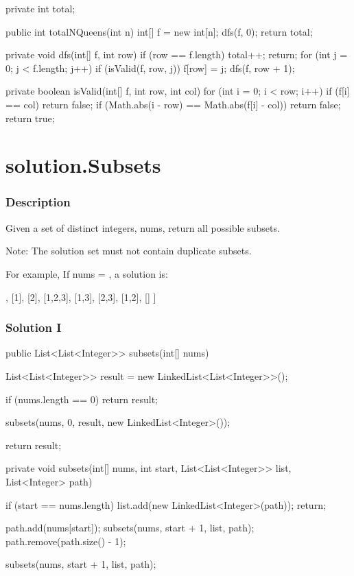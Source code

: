 \begin{Code}
private int total;

public int totalNQueens(int n) {
    int[] f = new int[n];
    dfs(f, 0);
    return total;
}

private void dfs(int[] f, int row) {
    if (row == f.length) {
        total++;
        return;
    }
    for (int j = 0; j < f.length; j++) {
        if (isValid(f, row, j)) {
            f[row] = j;
            dfs(f, row + 1);
        }
    }
}

private boolean isValid(int[] f, int row, int col) {
    for (int i = 0; i < row; i++) {
        if (f[i] == col) {
            return false;
        }
        if (Math.abs(i - row) == Math.abs(f[i] - col)) {
            return false;
        }
    }
    return true;
}
\end{Code}

\newpage

\section{solution.Subsets} %

\subsubsection{Description}

Given a set of distinct integers, nums, return all possible subsets.

Note: The solution set must not contain duplicate subsets.

For example,
If nums = \code{[1,2,3]}, a solution is:

\begin{Code}
[
  [3],
  [1],
  [2],
  [1,2,3],
  [1,3],
  [2,3],
  [1,2],
  []
]
\end{Code}

\subsubsection{Solution I}

\begin{Code}
public List<List<Integer>> subsets(int[] nums) {
    List<List<Integer>> result = new LinkedList<List<Integer>>();

    if (nums.length == 0) {
        return result;
    }

    subsets(nums, 0, result, new LinkedList<Integer>());

    return result;
}

private void subsets(int[] nums, int start, List<List<Integer>> list, List<Integer> path) {
    if (start == nums.length) {
        list.add(new LinkedList<Integer>(path));
        return;
    }

    path.add(nums[start]);
    subsets(nums, start + 1, list, path);
    path.remove(path.size() - 1);

    subsets(nums, start + 1, list, path);
}
\end{Code}

